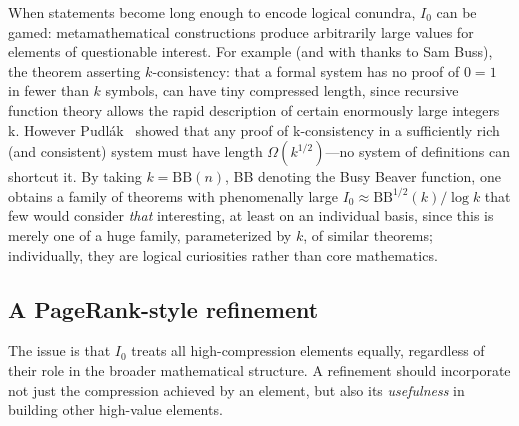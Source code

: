 \documentclass[12pt]{amsart}
\theoremstyle{definition}
\theoremstyle{remark}
\newcommand{\mynote}[3]{ \color{#3}(\textbf{#1}: #2)\color{black} }
\newcommand{\va}[1]{\mynote{Vitaly}{#1}{magenta}}
\begin{document}
When statements become long enough to encode logical conundra, $I_0$ can be gamed: metamathematical constructions produce arbitrarily large values for elements of questionable interest.
For example (and with thanks to  Sam Buss), the theorem asserting $k$-consistency: that a formal system has no proof of $0=1$ in fewer than $k$ symbols, can have tiny 
compressed length, since recursive function theory allows the rapid description of certain enormously large  integers k. 
However Pudl\'ak~\cite{Pudlak1986, Pudlak1987} showed that any proof  of k-consistency in a sufficiently rich (and consistent) system must have length $\Omega(k^{1/2})$---no system of definitions can shortcut it. By taking $k = \mathrm{BB}(n)$, BB denoting the Busy Beaver function, one obtains a family of theorems with phenomenally large $I_0 \approx \text{BB}^{1/2}(k)/\log k$  that few would consider \textit{that} interesting, at least on an individual basis, since this is merely one of a huge family, parameterized by $k$, of similar theorems; individually, they are logical curiosities rather than core mathematics.


\subsection{A PageRank-style refinement}
The issue is that $I_0$ treats all high-compression elements equally, regardless of their role in the broader mathematical structure.
A refinement should incorporate not just the compression achieved by an element, but also its \emph{usefulness} in building other high-value elements.
\end{document}

